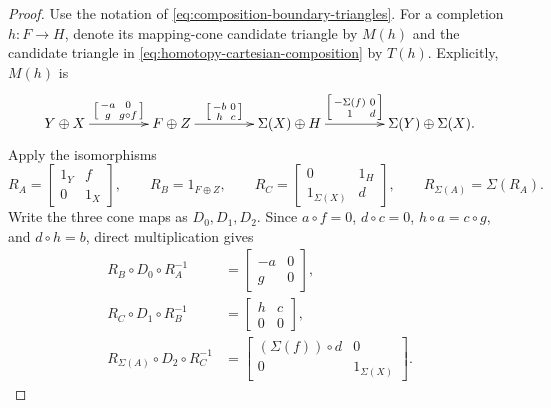 \documentclass[a4paper,11pt,reqno]{amsart}
\theoremstyle{definition}
\theoremstyle{plain}
\numberwithin{equation}{section}
\begin{document}
\begin{proof}
Use the notation of \eqref{eq:composition-boundary-triangles}.  For a
completion $h:F\to H$, denote its mapping-cone candidate triangle by $M(h)$ and the
candidate triangle in \eqref{eq:homotopy-cartesian-composition} by $T(h)$.  Explicitly,
$M(h)$ is
\begin{equation*}
\xymatrix@C=3.5pc{
Y\oplus X\ar[r]^-{\left[\begin{smallmatrix}-a&0\\g&g\circ f\end{smallmatrix}\right]}&
F\oplus Z\ar[r]^-{\left[\begin{smallmatrix}-b&0\\h&c\end{smallmatrix}\right]}&
\Sigma(X)\oplus H\ar[r]^-{\left[\begin{smallmatrix}-\Sigma(f)&0\\1&d\end{smallmatrix}\right]}&
\Sigma(Y)\oplus\Sigma(X).
}
\end{equation*}
Apply the isomorphisms
\begin{equation}
\label{eq:composition-cone-change}
 R_A=\begin{bmatrix}1_Y&f\\0&1_X\end{bmatrix},\qquad
 R_B=1_{F\oplus Z},\qquad
 R_C=\begin{bmatrix}0&1_H\\1_{\Sigma(X)}&d\end{bmatrix},\qquad
 R_{\Sigma(A)}=\Sigma(R_A).
\end{equation}
Write the three cone maps as $D_0,D_1,D_2$.  Since
$a\circ f=0$, $d\circ c=0$, $h\circ a=c\circ g$, and
$d\circ h=b$, direct multiplication gives
\[
\begin{aligned}
 R_B\circ D_0\circ R_A^{-1}
   &=\begin{bmatrix}-a&0\\ g&0\end{bmatrix},\\
 R_C\circ D_1\circ R_B^{-1}
   &=\begin{bmatrix}h&c\\0&0\end{bmatrix},\\
 R_{\Sigma(A)}\circ D_2\circ R_C^{-1}
   &=\begin{bmatrix}(\Sigma(f))\circ d&0\\0&1_{\Sigma(X)}\end{bmatrix}.
\end{aligned}
\]
\end{proof}
\end{document}
